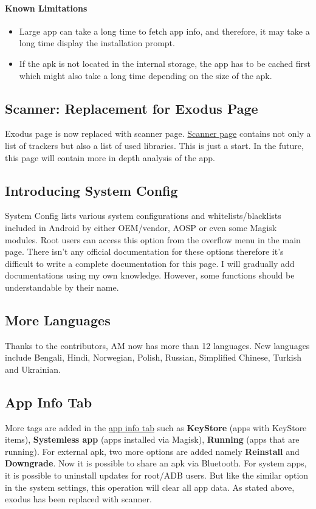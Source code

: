 \paragraph{Known Limitations}
\begin{itemize}
    \item Large app can take a long time to fetch app info, and therefore, it may take a long time display the installation prompt.
    \item If the apk is not located in the internal storage, the app has to be cached first which might also take
    a long time depending on the size of the apk.
\end{itemize}

\subsection{Scanner: Replacement for Exodus Page}
Exodus page is now replaced with scanner page. \hyperref[sec:scanner-page]{Scanner page} contains not only a list of
trackers but also a list of used libraries. This is just a start. In the future, this page will contain more in depth
analysis of the app.

\subsection{Introducing System Config}
System Config lists various system configurations and whitelists/blacklists included in Android by either OEM/vendor,
AOSP or even some Magisk modules. Root users can access this option from the overflow menu in the main page.
There isn't any official documentation for these options therefore it's difficult to write a complete documentation
for this page. I will gradually add documentations using my own knowledge. However, some functions should be
understandable by their name.

\subsection{More Languages}
Thanks to the contributors, AM now has more than 12 languages. New languages include Bengali, Hindi, Norwegian, Polish,
Russian, Simplified Chinese, Turkish and Ukrainian.

\subsection{App Info Tab}
More tags are added in the \hyperref[subsec:app-info-tab]{app info tab} such as \textbf{KeyStore} (apps with KeyStore
items), \textbf{Systemless app} (apps installed via Magisk), \textbf{Running} (apps that are running). For external apk,
two more options are added namely \textbf{Reinstall} and \textbf{Downgrade}. Now it is possible to share an apk via
Bluetooth. For system apps, it is possible to uninstall updates for root/ADB users. But like the similar option in the
system settings, this operation will clear all app data. As stated above, exodus has been replaced with scanner.


